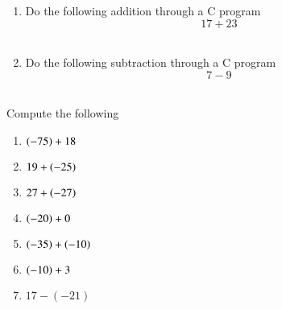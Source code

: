 \begin{enumerate}[label=\thesubsection.\arabic*, ref=\thesubsection.\theenumi]
\item Do the following addition through a C program
	$$17+23$$
	\\
	\solution
	
\item Do the following subtraction through a C program
$$7-9$$
	\\
	\solution
	
\end{enumerate}
Compute the following
\begin{enumerate}[label=\thesubsection.\arabic*, ref=\thesubsection.\theenumi,resume*]
\item $\left(-75\right)+18$
\item $19+\left(-25\right)$
\item $27+\left(-27\right)$
\item $\left(-20\right)+0$
\item $\left(-35\right)+\left(-10\right)$
\item $\left(-10\right)+3$
\item $17-(-21)$
\end{enumerate}
